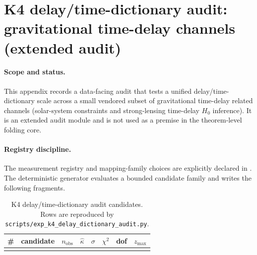 \section{K4 delay/time-dictionary audit: gravitational time-delay channels (extended audit)}
\label{app:k4_delay_audit}

\paragraph{Scope and status.}
\AuditTag This appendix records a data-facing audit that tests a unified delay/time-dictionary scale across a small vendored subset of gravitational time-delay related channels (solar-system constraints and strong-lensing time-delay $H_0$ inference).
It is an extended audit module and is not used as a premise in the theorem-level folding core.

\paragraph{Registry discipline.}
\AuditTag The measurement registry and mapping-family choices are explicitly declared in .
The deterministic generator  evaluates a bounded candidate family and writes the following fragments.

\begin{table}[t]
\centering
\scriptsize
\setlength{\tabcolsep}{6pt}
\renewcommand{\arraystretch}{1.15}
\begin{tabular}{r l r r r r r r}
\toprule
\# & candidate & $n_{\mathrm{obs}}$ & $\widehat\kappa$ & $\sigma$ & $\chi^2$ & dof & $z_{\max}$ \\
\midrule
%
\\
\bottomrule
\end{tabular}
\caption{K4 delay/time-dictionary audit candidates. Rows are reproduced by \texttt{scripts/exp\_k4\_delay\_dictionary\_audit.py}.}
\label{tab:k4_delay_audit}
\end{table}

%

